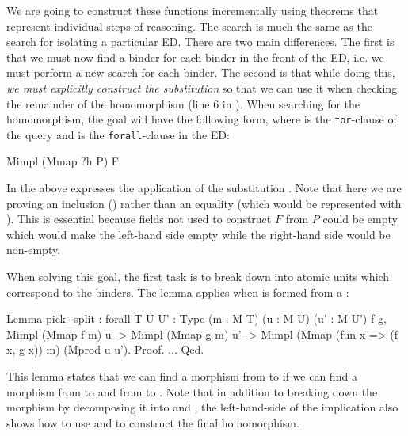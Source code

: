 \documentclass[preprint]{sigplanconf}
\begin{document}
We are going to construct these functions incrementally using theorems that represent individual steps of reasoning.
The search is much the same as the search for isolating a particular ED.
There are two main differences.
The first is that we must now find a binder for each binder in the front of the ED, i.e. we must perform a new search for each binder.
The second is that while doing this, \emph{we must explicitly construct the substitution } so that we can use it when checking the remainder of the homomorphism (line 6 in ).
When searching for the homomorphism, the goal will have the following form, where  is the {\tt for}-clause of the query and  is the {\tt forall}-clause in the ED:
\begin{coq}
Mimpl (Mmap ?h P) F
\end{coq}
In the above %
 expresses the application of the substitution .
Note that here we are proving an inclusion () rather than an equality (which would be represented with ).
This is essential because fields not used to construct $F$ from $P$ could be empty which would make the left-hand side empty while the right-hand side would be non-empty.

When solving this goal, the first task is to break  down into atomic units which correspond to the binders.
The  lemma applies when  is formed from a :
\begin{coq}
Lemma pick_split
: forall {T U U' : Type} (m : M T) (u : M U) (u' : M U') f g,
  Mimpl (Mmap f m) u ->
  Mimpl (Mmap g m) u' ->
  Mimpl (Mmap (fun x => (f x, g x)) m) (Mprod u u').
Proof. ... Qed.
\end{coq}
This lemma states that we can find a morphism from  to  if we can find a morphism from  to  and from  to .
Note that in addition to breaking down the morphism by decomposing it into  and , the left-hand-side of the implication also shows how to use  and  to construct the final homomorphism.
\end{document}
